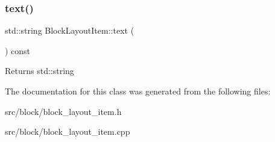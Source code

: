 \subsubsection{\texorpdfstring{text()}{text()}}
{\footnotesize\ttfamily std\+::string Block\+Layout\+Item\+::text (\begin{DoxyParamCaption}{ }\end{DoxyParamCaption}) const\hspace{0.3cm}{\ttfamily [inline]}}

\begin{DoxyReturn}{Returns}
std\+::string 
\end{DoxyReturn}


The documentation for this class was generated from the following files\+:\begin{DoxyCompactItemize}
\item 
src/block/block\+\_\+layout\+\_\+item.\+h\item 
src/block/block\+\_\+layout\+\_\+item.\+cpp\end{DoxyCompactItemize}
